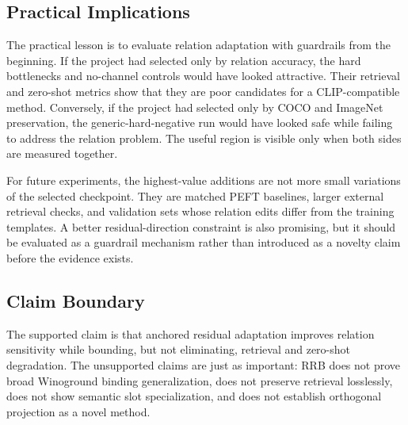 \subsection{Practical Implications}

The practical lesson is to evaluate relation adaptation with guardrails from the beginning. If the project had selected only by relation accuracy, the hard bottlenecks and no-channel controls would have looked attractive. Their retrieval and zero-shot metrics show that they are poor candidates for a CLIP-compatible method. Conversely, if the project had selected only by COCO and ImageNet preservation, the generic-hard-negative run would have looked safe while failing to address the relation problem. The useful region is visible only when both sides are measured together.

For future experiments, the highest-value additions are not more small variations of the selected checkpoint. They are matched PEFT baselines, larger external retrieval checks, and validation sets whose relation edits differ from the training templates. A better residual-direction constraint is also promising, but it should be evaluated as a guardrail mechanism rather than introduced as a novelty claim before the evidence exists.

\subsection{Claim Boundary}

The supported claim is that anchored residual adaptation improves relation sensitivity while bounding, but not eliminating, retrieval and zero-shot degradation. The unsupported claims are just as important: RRB does not prove broad Winoground binding generalization, does not preserve retrieval losslessly, does not show semantic slot specialization, and does not establish orthogonal projection as a novel method.
